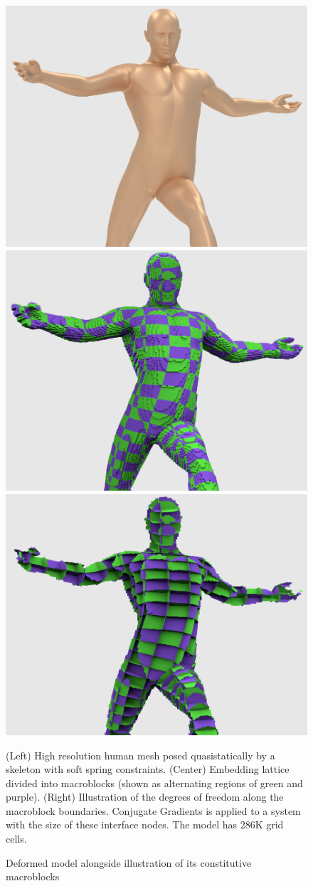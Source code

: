 \begin{figure}
 \begin{center} \includegraphics[width=.32\textwidth]{chapter_macroblocks/images/skinning_skin.png} \includegraphics[width=.32\textwidth]{chapter_macroblocks/images/skinning_macroblocks.png} \includegraphics[width=.32\textwidth]{chapter_macroblocks/images/skinning_interface.png} \end{center}
 \caption{Deformed model alongside illustration of its constitutive
   macroblocks}{(Left) High resolution human mesh posed
   quasistatically by a skeleton with soft spring
   constraints. (Center) Embedding lattice divided into macroblocks
   (shown as alternating regions of green and purple). (Right)
   Illustration of the degrees of freedom along the macroblock
   boundaries. Conjugate Gradients is applied to a system with the
   size of these interface nodes. The model has 286K grid cells.}
 \label{fig:macroblocks:skinning-example}

 \end{figure} 

